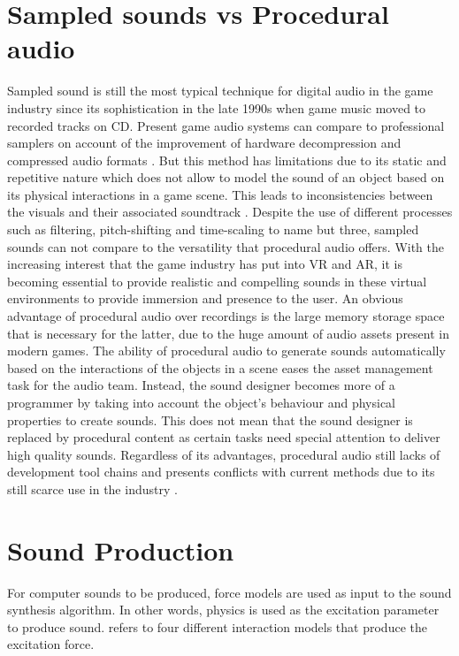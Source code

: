 \section{Sampled sounds vs Procedural audio}

Sampled sound is still the most typical technique for digital audio in the game industry since its sophistication in the late 1990s when game music moved to recorded tracks on CD. Present game audio systems can compare to professional samplers on account of the improvement of hardware decompression and compressed audio formats \cite{farnell2007introduction}. But this method has limitations due to its static and repetitive nature which does not allow to model the sound of an object based on its physical interactions in a game scene. This leads to inconsistencies between the visuals and their associated soundtrack \cite{picard2009expressive}. Despite the use of different processes such as filtering, pitch-shifting and time-scaling to name but three, sampled sounds can not compare to the versatility that procedural audio offers. With the increasing interest that the game industry has put into \gls{VR} and \gls{AR}, it is becoming essential to provide realistic and compelling sounds in these virtual environments to provide immersion and presence to the user. An obvious advantage of procedural audio over recordings is the large memory storage space that is necessary for the latter, due to the huge amount of audio assets present in modern games. The ability of procedural audio to generate sounds automatically based on the interactions of the objects in a scene eases the asset management task for the audio team. Instead, the sound designer becomes more of a programmer by taking into account the object’s behaviour and physical properties to create sounds. This does not mean that the sound designer is replaced by procedural content as certain tasks need special attention to deliver high quality sounds. Regardless of its advantages, procedural audio still lacks of development tool chains and presents conflicts with current methods due to its still scarce use in the industry \cite{farnell2010designing}.

\section{Sound Production}

For computer sounds to be produced, force models are used as input to the sound synthesis algorithm. In other words, physics is used as the excitation parameter to produce sound. \cite{van2003modal} refers to four different interaction models that produce the excitation force.

